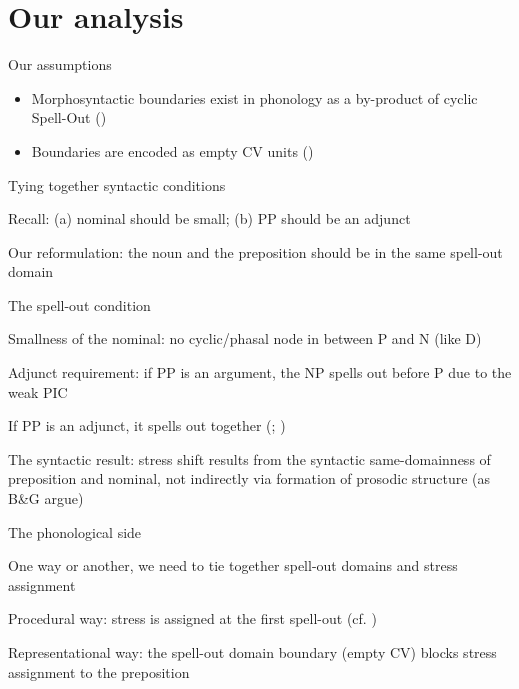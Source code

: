\documentclass{beamer}
\begin{document}
	\section{Our analysis}

	\begin{frame}{Our assumptions}

		\begin{itemize}
			\item Morphosyntactic boundaries exist in phonology as a by-product of cyclic Spell-Out (\cite{Scheer:2016})

			\item Boundaries are encoded as empty CV units (\cite{Scheer:2012})

		\end{itemize}

	\end{frame}

	\begin{frame}{Tying together syntactic conditions}

		Recall: (a) nominal should be small; (b) PP should be an adjunct

		Our reformulation: the noun and the preposition should be in the same spell-out domain

	\end{frame}

	\begin{frame}{The spell-out condition}

		Smallness of the nominal: no cyclic/phasal node in between P and N (like D)

		Adjunct requirement: if PP is an argument, the NP spells out before P due to the weak PIC

		If PP is an adjunct, it spells out together (\cite{Stepanov:2007}; \cite{Privoznov:2021})

		The syntactic result: stress shift results from the syntactic same-domainness of preposition and nominal, not indirectly via formation of prosodic structure (as B\&G argue)

	\end{frame}

	\begin{frame}{The phonological side}
	
		One way or another, we need to tie together spell-out domains and stress assignment

		Procedural way: stress is assigned at the first spell-out (cf. \cite{Marvin:2013})

		Representational way: the spell-out domain boundary (empty CV) blocks stress assignment to the preposition

	\end{frame}
\end{document}
